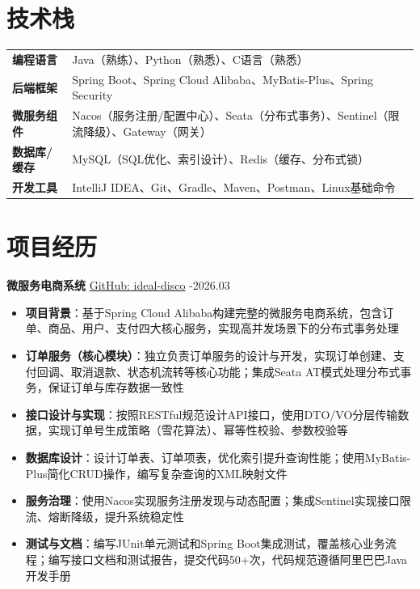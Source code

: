 \documentclass[11pt,a4paper]{article}
\begin{document}
\section{技术栈}
\begin{tabularx}{\textwidth}{@{}lX@{}}
    \textbf{编程语言} & Java（熟练）、Python（熟悉）、C语言（熟悉） \\[0.2em]
    \textbf{后端框架} & Spring Boot、Spring Cloud Alibaba、MyBatis-Plus、Spring Security \\[0.2em]
    \textbf{微服务组件} & Nacos（服务注册/配置中心）、Seata（分布式事务）、Sentinel（限流降级）、Gateway（网关） \\[0.2em]
    \textbf{数据库/缓存} & MySQL（SQL优化、索引设计）、Redis（缓存、分布式锁） \\[0.2em]
    \textbf{开发工具} & IntelliJ IDEA、Git、Gradle、Maven、Postman、Linux基础命令
\end{tabularx}
\vspace{0.2em}

\section{项目经历}
\textbf{微服务电商系统} \hfill \href{https://github.com/RicardoMLu0526/ideal-disco}{GitHub: ideal-disco} -2026.03
\begin{itemize}
    \item \textbf{项目背景}：基于Spring Cloud Alibaba构建完整的微服务电商系统，包含订单、商品、用户、支付四大核心服务，实现高并发场景下的分布式事务处理
    \item \textbf{订单服务（核心模块）}：独立负责订单服务的设计与开发，实现订单创建、支付回调、取消退款、状态机流转等核心功能；集成Seata AT模式处理分布式事务，保证订单与库存数据一致性
    \item \textbf{接口设计与实现}：按照RESTful规范设计API接口，使用DTO/VO分层传输数据，实现订单号生成策略（雪花算法）、幂等性校验、参数校验等
    \item \textbf{数据库设计}：设计订单表、订单项表，优化索引提升查询性能；使用MyBatis-Plus简化CRUD操作，编写复杂查询的XML映射文件
    \item \textbf{服务治理}：使用Nacos实现服务注册发现与动态配置；集成Sentinel实现接口限流、熔断降级，提升系统稳定性
    \item \textbf{测试与文档}：编写JUnit单元测试和Spring Boot集成测试，覆盖核心业务流程；编写接口文档和测试报告，提交代码50+次，代码规范遵循阿里巴巴Java开发手册
\end{itemize}
\vspace{0.2em}
\end{document}
